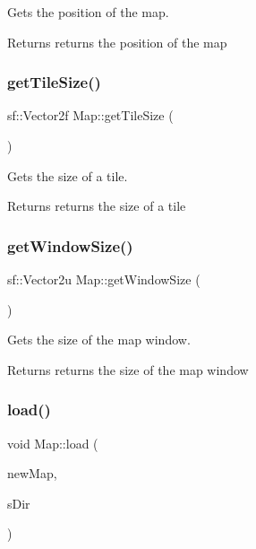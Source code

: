 Gets the position of the map. 

\begin{DoxyReturn}{Returns}
returns the position of the map 
\end{DoxyReturn}
\mbox{\label{class_map_a8345e18835c2762a548fa46b95e4bc20}} 
\subsubsection{\texorpdfstring{get\+Tile\+Size()}{getTileSize()}}
{\footnotesize\ttfamily sf\+::\+Vector2f Map\+::get\+Tile\+Size (\begin{DoxyParamCaption}{ }\end{DoxyParamCaption})}



Gets the size of a tile. 

\begin{DoxyReturn}{Returns}
returns the size of a tile 
\end{DoxyReturn}
\mbox{\label{class_map_aeacab64b9591670cc0c908eb61ec692a}} 
\subsubsection{\texorpdfstring{get\+Window\+Size()}{getWindowSize()}}
{\footnotesize\ttfamily sf\+::\+Vector2u Map\+::get\+Window\+Size (\begin{DoxyParamCaption}{ }\end{DoxyParamCaption})}



Gets the size of the map window. 

\begin{DoxyReturn}{Returns}
returns the size of the map window 
\end{DoxyReturn}
\mbox{\label{class_map_a80708a0d73fa78f28c41c02ac4ebec14}} 
\subsubsection{\texorpdfstring{load()}{load()}}
{\footnotesize\ttfamily void Map\+::load (\begin{DoxyParamCaption}\item[{\hyperlink{_map_8h_a4c73d8aa04c5b31558f468b95d4748b3}{Map\+Type}}]{new\+Map,  }\item[{std\+::string}]{s\+Dir }\end{DoxyParamCaption})}



